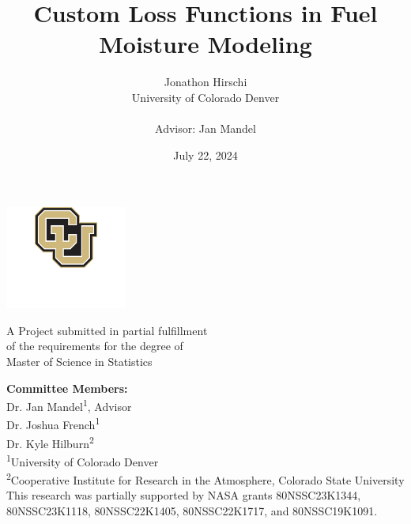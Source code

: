 \documentclass[11pt]{article}%
\begin{document}
 
\title{Custom Loss Functions in Fuel Moisture Modeling}
\author{
    \begin{tabular}[t]{c}
        Jonathon Hirschi \\
        University of Colorado Denver \\
        \\
        Advisor: Jan Mandel
    \end{tabular}
}

\date{July 22, 2024}
\maketitle

\begin{center}
    \includegraphics[width=0.3\textwidth]{images/university_logo.png}


    A Project submitted in partial fulfillment\\ of the requirements for the degree of\\ Master of Science in Statistics

    \vspace{1em}

    \textbf{Committee Members:}\\
    Dr. Jan Mandel\textsuperscript{1}, Advisor\\
    Dr. Joshua French\textsuperscript{1}\\
    Dr. Kyle Hilburn\textsuperscript{2}\\

    \textsuperscript{1}University of Colorado Denver\\
    \textsuperscript{2}Cooperative Institute for Research in the Atmosphere, Colorado State University\\

    \vspace{10em}
    This research was partially supported by NASA grants 80NSSC23K1344, 80NSSC23K1118, 80NSSC22K1405, 80NSSC22K1717, and 80NSSC19K1091.
    
\end{center}

\newpage
\end{document}
